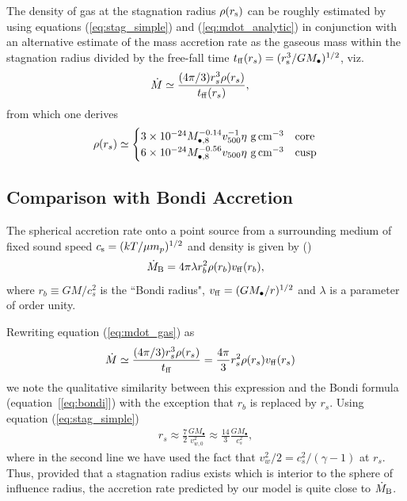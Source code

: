 \documentclass[usenatbib,fleqn]{mn2e}
\newcommand{\rs}{r_s}
\newcommand{\rb}{r_b}
\newcommand{\Mbh}[1][]{M_{\bullet#1}}
\newcommand{\Mbheight}{M_{\bullet,8}}
\newcommand{\ff}{\rm ff}
\newcommand{\vwO}{v_{w,0}}
\begin{document}
The density of gas at the stagnation radius $\rho(r_{\rm s})$ can be roughly estimated by using equations (\ref{eq:stag_simple}) and (\ref{eq:mdot_analytic}) in conjunction with an alternative estimate of the mass accretion rate as the gaseous mass within the stagnation radius divided by the free-fall time $t_{\rm ff}(\rs) = (r_{\rm s}^{3}/GM_{\bullet})^{1/2}$, viz.
\begin{align}
  &\dot{M}\simeq\frac{(4 \pi/3) \rs^3 \rho(\rs)}{t_{\ff}(\rs)},
  \label{eq:mdot_gas}
\end{align}
from which one derives 
\begin{align}
  \rho(\rs)\simeq
  \begin{cases}
    3 \times 10^{-24} \Mbheight^{-0.14} v_{500}^{-1}  \eta \,
    \, {\rm g \, cm^{-3}}& \text{core}\\
    6 \times 10^{-24}  \Mbheight^{-0.56} v_{500}    \eta \,\, {\rm g \,cm^{-3}} & \text{cusp}
  \end{cases}
  \label{eq:rhors}
\end{align}


\subsection{Comparison with Bondi Accretion}
The spherical accretion rate onto a point source from a surrounding medium of fixed sound speed $c_{\rm s} = (kT/\mu m_p)^{1/2}$ and density is given by (\citealt{Bondi52}) 
\begin{align}
  \dot{M}_{\rm B} =4\pi \lambda r_b^2 \rho(r_b) v_{\rm ff}(r_b),
\label{eq:bondi}
\end{align}
where $r_b \equiv GM/c_{s}^{2}$ is the ``Bondi radius", $v_{\rm ff} = (GM_{\bullet}/r)^{1/2}$ and $\lambda$ is a parameter of order unity.  

Rewriting equation (\ref{eq:mdot_gas}) as
\begin{align}
  &\dot{M}\simeq\frac{(4 \pi/3) \rs^3 \rho(\rs)}{t_{\ff}} =\frac{4 \pi}{3} \rs^2 \rho(\rs) v_{\ff}(\rs)
\end{align}
we note the qualitative similarity between this expression and the Bondi formula (equation~[\ref{eq:bondi}]) with the exception that $\rb$ is replaced by $\rs$.  Using equation (\ref{eq:stag_simple})
\begin{align}
  \rs\approx\frac{7}{2}\frac{G \Mbh}{\vwO^2} \approx \frac{14}{3}\frac{GM_{\bullet}}{c_{s}^{2}},
  \label{eq:rs_simple}
\end{align}
where in the second line we have used the fact that $v_{w}^{2}/2 =
c_s^2/(\gamma-1)$ at $\rs$.  Thus, provided that a stagnation radius
exists which is interior to the sphere of influence radius, the
accretion rate predicted by our model is quite close to $\dot{M}_{\rm
  B}$.
\end{document}
